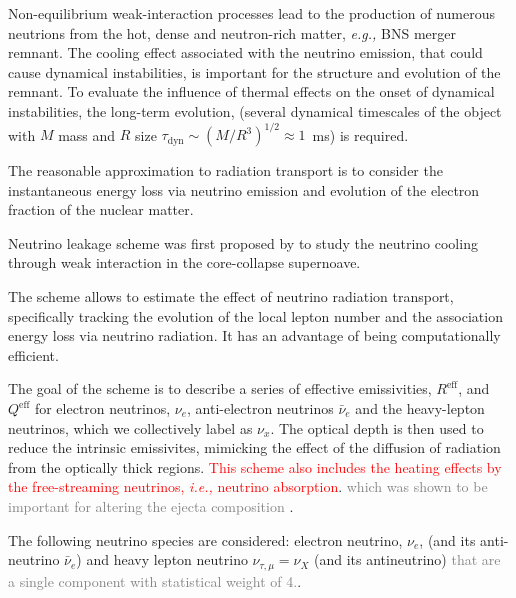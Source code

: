 \documentclass[11pt,a4paper,headinclude=true,DIV=14,BCOR=8mm,chapterprefix,listof=totoc,twoside,openright,abstracton]{scrbook}
\newcommand{\red}[1]{\textcolor{red}{#1}}
\newcommand{\gray}[1]{\textcolor{gray}{#1}}
\begin{document}
Non-equilibrium weak-interaction processes lead to the production of numerous neutrions from the hot, dense and neutron-rich matter, \textit{e.g.,} BNS merger remnant. The cooling effect associated with the neutrino emission, that could cause dynamical instabilities, is important for the structure and evolution of the remnant. 
To evaluate the influence of thermal effects on the onset of dynamical instabilities, the long-term evolution, (several dynamical timescales of the object with $M$ mass and $R$ size $\tau_{\text{dyn}}\sim(M/R^3)^{1/2}\approx 1$~ms) is required.

The reasonable approximation to radiation transport is to consider the instantaneous energy loss via neutrino emission and evolution of the electron fraction of the nuclear matter.

Neutrino leakage scheme was first proposed by \cite{vanRiper:1981mko} to study the neutrino cooling through weak interaction in the core-collapse supernoave.

The scheme allows to estimate the effect of neutrino radiation transport, specifically tracking the evolution of the local lepton number and the association energy loss via neutrino radiation.
It has an advantage of being computationally efficient.

The goal of the scheme is to describe a series of effective emissivities, $R^{\text{eff}}$, and $Q^{\text{eff}}$ for electron neutrinos, $\nu_e$, anti-electron neutrinos $\bar{\nu}_e$ and the heavy-lepton neutrinos, which we collectively label as $\nu_x$.
The optical depth is then used to reduce the intrinsic emissivites, mimicking the effect of the diffusion of radiation from the optically thick regions.
\red{This scheme also includes the heating effects by the free-streaming neutrinos, \textit{i.e.,} neutrino absorption}. \gray{ which was shown to be important for altering the ejecta composition }.



The following neutrino species are considered: electron neutrino, $\nu_e$, (and its anti-neutrino $\bar{\nu}_e$) and heavy lepton neutrino $\nu_{\tau,\mu}=\nu_X$ (and its antineutrino) \gray{that are a single component with statistical weight of 4.}.
\end{document}
